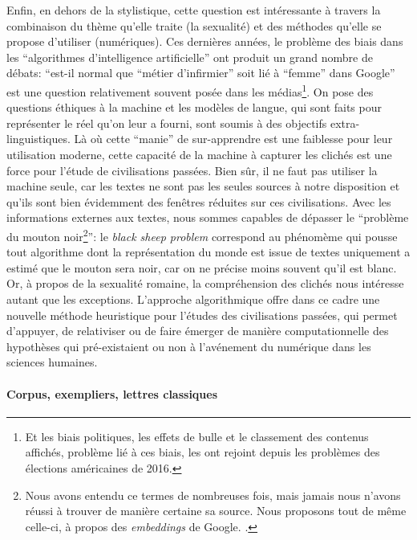 Enfin, en dehors de la stylistique, cette question est intéressante à travers la combinaison du thème qu'elle traite (la sexualité) et des méthodes qu'elle se propose d'utiliser (numériques). Ces dernières années, le problème des biais dans les \enquote{algorithmes d'intelligence artificielle} ont produit un grand nombre de débats: \enquote{est-il normal que ``métier d'infirmier'' soit lié à ``femme'' dans Google} est une question relativement souvent posée dans les médias\footnote{Et les biais politiques, les effets de bulle et le classement des contenus affichés, problème lié à ces biais, les ont rejoint depuis les problèmes des élections américaines de 2016.}. On pose des questions éthiques à la machine et les modèles de langue, qui sont faits pour représenter le réel qu'on leur a fourni, sont soumis à des objectifs extra-linguistiques. Là où cette \enquote{manie} de sur-apprendre est une faiblesse pour leur utilisation moderne, cette capacité de la machine à capturer les clichés est une force pour l'étude de civilisations passées. Bien sûr, il ne faut pas utiliser la machine seule, car les textes ne sont pas les seules sources à notre disposition et qu'ils sont bien évidemment des fenêtres réduites sur ces civilisations. Avec les informations externes aux textes, nous sommes capables de dépasser le \enquote{problème du mouton noir\footnote{Nous avons entendu ce termes de nombreuses fois, mais jamais nous n'avons réussi à trouver de manière certaine sa source. Nous proposons tout de même celle-ci, à propos des \textit{embeddings} de Google. \textcite{daume_blacksheep_2016}.}}: le \textit{black sheep problem} correspond au phénomème qui pousse tout algorithme dont la représentation du monde est issue de textes uniquement a estimé que le mouton sera noir, car on ne précise moins souvent qu'il est blanc. Or, à propos de la sexualité romaine, la compréhension des clichés nous intéresse autant que les exceptions. L'approche algorithmique offre dans ce cadre une nouvelle méthode heuristique pour l'études des civilisations passées, qui permet d'appuyer, de relativiser ou de faire émerger de manière computationnelle des hypothèses qui pré-existaient ou non à l'avénement du numérique dans les sciences humaines.

\paragraph{Corpus, exempliers, lettres classiques}

